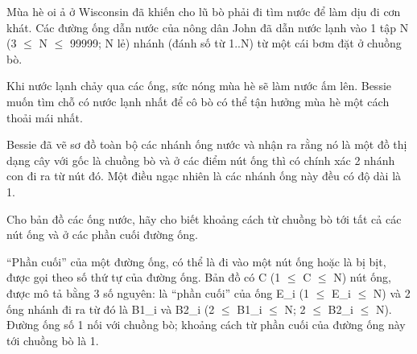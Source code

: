Mùa hè oi ả ở Wisconsin đã khiến cho lũ bò phải đi tìm nước để làm dịu đi cơn khát. Các đường ống dẫn nước của nông dân John đã dẫn nước lạnh vào 1 tập N (3  $\le$  N  $\le$  99999; N lẻ) nhánh (đánh số từ 1..N) từ một cái bơm đặt ở chuồng bò.  

   Khi nước lạnh chảy qua các ống, sức nóng mùa hè sẽ làm nước ấm lên.  Bessie muốn tìm chỗ có nước lạnh nhất để cô bò có thể tận hưởng mùa  hè một cách thoải mái nhất.  

   Bessie đã vẽ sơ đồ toàn bộ các nhánh ống nước và nhận ra rằng nó là  một đồ thị dạng cây với gốc là chuồng bò và ở các điểm nút ống thì  có chính xác 2 nhánh con đi ra từ nút đó. Một điều ngạc nhiên là  các nhánh ống này đều có độ dài là 1.  

   Cho bản đồ các ống nước, hãy cho biết khoảng cách từ chuồng bò  tới tất cả các nút ống và ở các phần cuối đường ống.  

   “Phần cuối” của một đường ống, có thể là đi vào một nút ống hoặc  là bị bịt, được gọi theo số thứ tự của đường ống. Bản đồ có C  (1  $\le$  C  $\le$  N) nút ống, được mô tả bằng 3 số nguyên: là “phần cuối”  của ống E\_i (1  $\le$  E\_i  $\le$  N) và 2 ống nhánh đi ra từ đó là  B1\_i và B2\_i (2  $\le$  B1\_i  $\le$  N; 2  $\le$  B2\_i  $\le$  N). Đường ống số 1 nối  với chuồng bò; khoảng cách từ phần cuối của đường ống này  tới chuồng bò là 1.